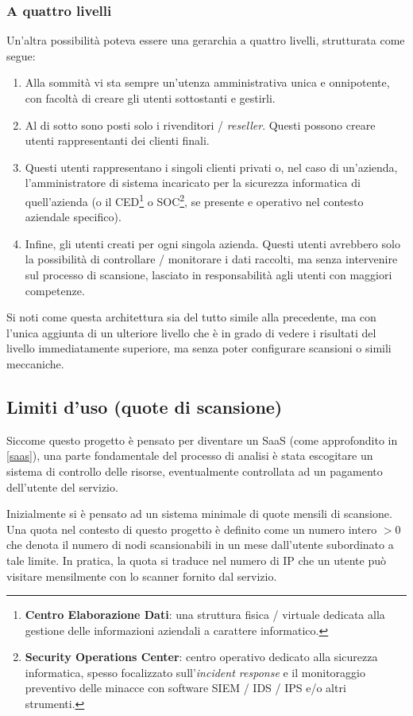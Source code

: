 \subsubsection{A quattro livelli}
\label{4-level}
Un'altra possibilità poteva essere una gerarchia a quattro livelli, strutturata come segue:
\begin{enumerate}
    \item Alla sommità vi sta sempre un'utenza amministrativa unica e onnipotente, con facoltà di creare gli utenti sottostanti e gestirli.
    \item Al di sotto sono posti solo i rivenditori / \emph{reseller}. Questi possono creare utenti rappresentanti dei clienti finali.
    \item Questi utenti rappresentano i singoli clienti privati o, nel caso di un'azienda, l'amministratore di sistema incaricato per la sicurezza informatica di quell'azienda (o il CED\footnote{\textbf{Centro Elaborazione Dati}: una struttura fisica / virtuale dedicata alla gestione delle informazioni aziendali a carattere informatico.} o SOC\footnote{\textbf{Security Operations Center}: centro operativo dedicato alla sicurezza informatica, spesso focalizzato sull'\emph{incident response} e il monitoraggio preventivo delle minacce con software SIEM / IDS / IPS e/o altri strumenti.}, se presente e operativo nel contesto aziendale specifico).
    \item Infine, gli utenti creati per ogni singola azienda. Questi utenti avrebbero solo la possibilità di controllare / monitorare i dati raccolti, ma senza intervenire sul processo di scansione, lasciato in responsabilità agli utenti con maggiori competenze.
\end{enumerate}
Si noti come questa architettura sia del tutto simile alla precedente, ma con l'unica aggiunta di un ulteriore livello che è in grado di vedere i risultati del livello immediatamente superiore, ma senza poter configurare scansioni o simili meccaniche.

\subsection{Limiti d'uso (quote di scansione)}
\label{quote-spec}
Siccome questo progetto è pensato per diventare un SaaS (come approfondito in \ref{saas}), una parte fondamentale del processo di analisi è stata escogitare un sistema di controllo delle risorse, eventualmente controllata ad un pagamento dell'utente del servizio.

Inizialmente si è pensato ad un sistema minimale di quote mensili di scansione. Una quota nel contesto di questo progetto è definito come un numero intero $> 0$ che denota il numero di nodi scansionabili in un mese dall'utente subordinato a tale limite. In pratica, la quota si traduce nel numero di IP che un utente può visitare mensilmente con lo scanner fornito dal servizio.

